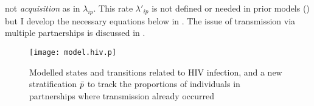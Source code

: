 not \emph{acquisition} as in $\lambda_{ip}$.
This rate $\lambda'_{ip}$ is not defined or needed in prior models ()
but I develop the necessary equations below in .
The issue of transmission via multiple partnerships is discussed in .
\begin{figure}
  \centering\texttt{[image: model.hiv.p]}
  \caption{Modelled states and transitions related to HIV infection,
    and a new stratification $\bar{p}$ to track
    the proportions of individuals in partnerships where transmission already occurred}
  \label{fig:model.hiv.p}
\end{figure}
